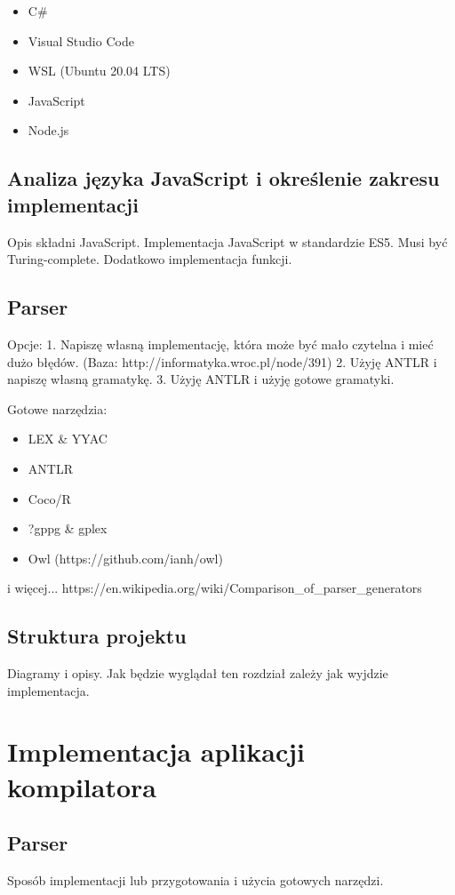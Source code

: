 \documentclass[a4paper]{article}
\begin{document}
\begin{itemize}
  \item C\#
  \item Visual Studio Code
  \item WSL (Ubuntu 20.04 LTS)
  \item JavaScript
  \item Node.js
\end{itemize}

\subsection{Analiza języka JavaScript i określenie zakresu implementacji}
Opis składni JavaScript.
Implementacja JavaScript w standardzie ES5.
Musi być Turing-complete. Dodatkowo implementacja funkcji.

\subsection{Parser}
Opcje:
1. Napiszę własną implementację, która może być mało czytelna i mieć dużo błędów. (Baza: http://informatyka.wroc.pl/node/391)
2. Użyję ANTLR i napiszę własną gramatykę.
3. Użyję ANTLR i użyję gotowe gramatyki.

Gotowe narzędzia:
\begin{itemize}
  \item LEX \& YYAC
  \item ANTLR
  \item Coco/R
  \item ?gppg \& gplex
  \item Owl (https://github.com/ianh/owl)
\end{itemize}
i więcej... https://en.wikipedia.org/wiki/Comparison\_of\_parser\_generators


\subsection{Struktura projektu}
Diagramy i opisy.
Jak będzie wyglądał ten rozdział zależy jak wyjdzie implementacja.

\section{Implementacja aplikacji kompilatora}
\subsection{Parser}
Sposób implementacji lub przygotowania i użycia gotowych narzędzi.
\end{document}
